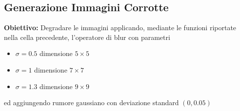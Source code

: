 \subsection{Generazione Immagini Corrotte}
\textbf{Obiettivo:}
Degradare le immagini applicando, mediante le funzioni riportate nella cella precedente,  l'operatore di blur con parametri
\begin{itemize}
    \item{$\sigma=0.5$ dimensione $5\times 5$}
    \item{$\sigma=1$ dimensione $7\times 7$}
    \item{$\sigma=1.3$ dimensione $9\times 9$}
\end{itemize}
ed aggiungendo rumore gaussiano con deviazione standard $(0,0.05)$

